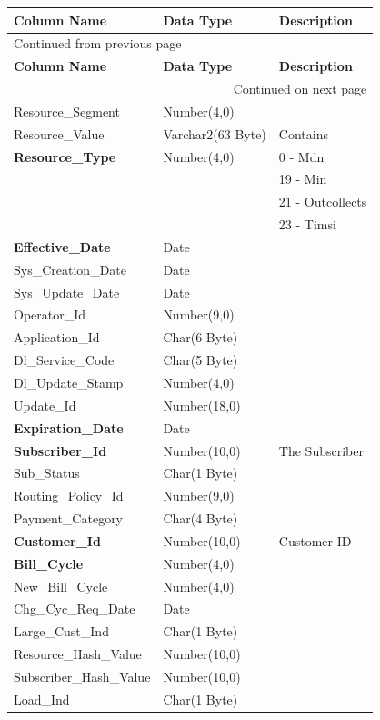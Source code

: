 \documentclass[12pt,twoside]{article}
\begin{document}
\begin{longtable}{l|l|l}
\hline
\textbf{Column Name} & \textbf{Data Type} & \textbf{Description}\\
\hline
\endfirsthead
\multicolumn{3}{l}{Continued from previous page} \\
\hline

\textbf{Column Name} & \textbf{Data Type} & \textbf{Description} \\

\hline
\endhead
\hline\multicolumn{3}{r}{Continued on next page} \\
\endfoot
\endlastfoot
\hline
Resource\_Segment & Number(4,0) & \\
Resource\_Value & Varchar2(63 Byte) & Contains\\
\textbf{Resource\_Type} & Number(4,0) & 0 - Mdn\\
 &  & 19 - Min\\
 &  & 21 - Outcollects\\
 &  & 23 - Timsi\\
\textbf{Effective\_Date} & Date & \\
Sys\_Creation\_Date & Date & \\
Sys\_Update\_Date & Date & \\
Operator\_Id & Number(9,0) & \\
Application\_Id & Char(6 Byte) & \\
Dl\_Service\_Code & Char(5 Byte) & \\
Dl\_Update\_Stamp & Number(4,0) & \\
Update\_Id & Number(18,0) & \\
\textbf{Expiration\_Date} & Date & \\
\textbf{Subscriber\_Id} & Number(10,0) & The Subscriber\\
Sub\_Status & Char(1 Byte) & \\
Routing\_Policy\_Id & Number(9,0) & \\
Payment\_Category & Char(4 Byte) & \\
\textbf{Customer\_Id} & Number(10,0) & Customer ID\\
\textbf{Bill\_Cycle} & Number(4,0) & \\
New\_Bill\_Cycle & Number(4,0) & \\
Chg\_Cyc\_Req\_Date & Date & \\
Large\_Cust\_Ind & Char(1 Byte) & \\
Resource\_Hash\_Value & Number(10,0) & \\
Subscriber\_Hash\_Value & Number(10,0) & \\
Load\_Ind & Char(1 Byte) & \\
\hline
\end{longtable}
\end{document}
